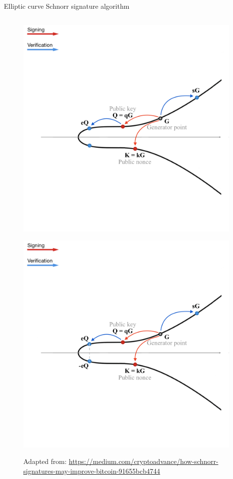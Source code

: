 \documentclass[slidescentered]{beamer}
\newcommand{\source}[1]{\caption*{\tiny Adapted from: {#1}} }
\begin{document}
\begin{frame}{Elliptic curve Schnorr signature algorithm}
\begin{columns}
\begin{column}{0.5\linewidth}
\begin{figure}
{						\source{\tiny \url{https://medium.com/cryptoadvance/how-schnorr-signatures-may-improve-bitcoin-91655bcb4744}}}
					 {\vspace*{-0.7cm}
						\hspace*{-0.9cm}
						\includegraphics[scale=0.28]{images/Schnorr5}
						\source{\tiny \url{https://medium.com/cryptoadvance/how-schnorr-signatures-may-improve-bitcoin-91655bcb4744}}}
					 {\vspace*{-0.7cm}
						\hspace*{-0.9cm}
						\includegraphics[scale=0.28]{images/Schnorr6}
}
\end{figure}
\end{column}
\end{columns}
\end{frame}
\end{document}
